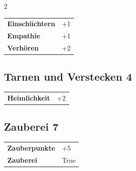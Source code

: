 \begin{multicols}{2}
\begin{tcolorbox}
\begin{tabular}{@{}ll@{}}
    \textbf{Einschüchtern} & +1\\
    \textbf{Empathie} & +1\\
    \textbf{Verhören} & +2\\
\end{tabular}


\end{tcolorbox}

\begin{tcolorbox}
    \subsection*{Tarnen und Verstecken \hfill \small{4 }}
    \tcblower




\begin{tabular}{@{}ll@{}}
    \textbf{Heimlichkeit} & +2\\
\end{tabular}


\end{tcolorbox}

\begin{tcolorbox}
    \subsection*{Zauberei \hfill \small{7 }}
    \tcblower




\begin{tabular}{@{}ll@{}}
    \textbf{Zauberpunkte} & +5\\
    \textbf{Zauberei} & True\\
\end{tabular}


\end{tcolorbox}

\begin{tcolorbox}

\end{tcolorbox}
\end{multicols}
